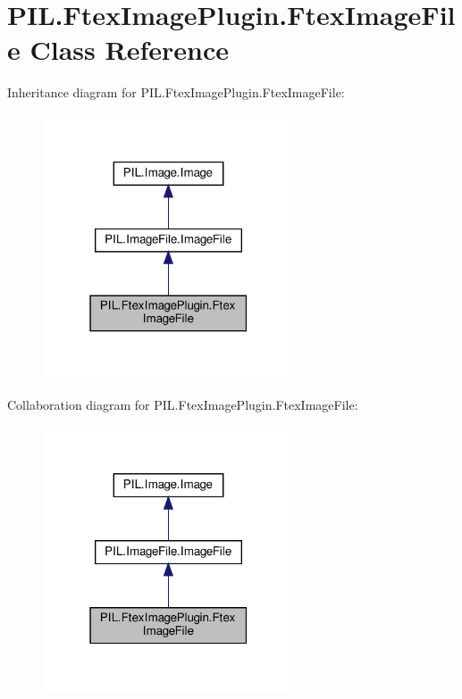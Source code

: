 \hypertarget{classPIL_1_1FtexImagePlugin_1_1FtexImageFile}{}\section{P\+I\+L.\+Ftex\+Image\+Plugin.\+Ftex\+Image\+File Class Reference}
\label{classPIL_1_1FtexImagePlugin_1_1FtexImageFile}


Inheritance diagram for P\+I\+L.\+Ftex\+Image\+Plugin.\+Ftex\+Image\+File\+:
\nopagebreak
\begin{figure}[H]
\begin{center}
\leavevmode
\includegraphics[width=211pt]{classPIL_1_1FtexImagePlugin_1_1FtexImageFile__inherit__graph}
\end{center}
\end{figure}


Collaboration diagram for P\+I\+L.\+Ftex\+Image\+Plugin.\+Ftex\+Image\+File\+:
\nopagebreak
\begin{figure}[H]
\begin{center}
\leavevmode
\includegraphics[width=211pt]{classPIL_1_1FtexImagePlugin_1_1FtexImageFile__coll__graph}
\end{center}
\end{figure}
